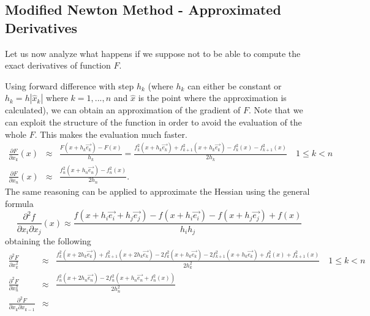 \medskip
\subsection*{Modified Newton Method - Approximated Derivatives}
Let us now analyze what happens if we suppose not to be able to compute the exact derivatives of function $F$.

Using forward difference with step $h_k$ (where $h_k$ can either be constant or $h_k=h|\hat{x}_k|$ where $k=1,...,n$ and $\hat{x}$ is the point 
where the approximation is calculated), we can obtain an approximation of the gradient of $F$. Note that we can exploit the structure of the function
in order to avoid the evaluation of the whole $F$. This makes the evaluation much faster.
\begin{eqnarray*}
    \frac{\partial F}{\partial x_k}(x) &\approx& \frac{F(x+h_k \vec{e_k})-F(x)}{h_k} 
    = \frac{f_k^2(x+h_k \vec{e_k}) +f_{k+1}^2(x+h_k\vec{e_k}) -f_k^2(x) -f_{k+1}^2(x) }{2h_k} \quad 1\leq k<n \\
    \frac{\partial F}{\partial x_n}(x) &\approx& \frac{f_n^2(x+h_n\vec{e_n}) - f_n^2(x)}{2h_n}.
\end{eqnarray*}
The same reasoning can be applied to approximate the Hessian using the general formula 
$$\frac{\partial^2 f}{\partial x_i \partial x_j} (x) \approx \frac{f(x+h_i\vec{e_i}+h_j\vec{e_j}) - f(x+h_i\vec{e_i}) - f(x+h_j\vec{e_j}) + f(x) }{h_ih_j}$$
obtaining the following 
\begin{eqnarray*}
    \frac{\partial^2 F}{\partial x_k^2} &\approx& \frac{f_k^2(x+2h_k\vec{e_k}) + f_{k+1}^2(x+2h_k\vec{e_k}) -2f_k^2(x+h_k\vec{e_k}) -2f_{k+1}^2(x+h_k\vec{e_k}) +f_k^2(x) + f_{k+1}^2(x) }{2h_k^2} \quad 1 \leq k <n \\
    \frac{\partial^2 F}{\partial x_n^2} &\approx& \frac{f_n^2(x+2h_n\vec{e_n}) - 2f_n^2(x+h_n\vec{e_n} + f_n^2(x)) }{2h_n^2} \\
    \frac{\partial^2 F}{\partial x_k \partial x_{k-1}} &\approx& \frac{ }{}
\end{eqnarray*}

